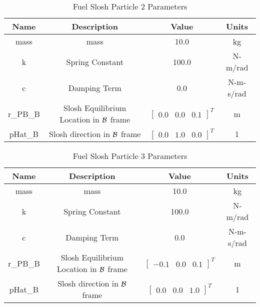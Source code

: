 \begin{table}[htbp]
	\caption{Fuel Slosh Particle 2 Parameters}
	\label{tab:slosh2}
	\centering \fontsize{10}{10}\selectfont
	\begin{tabular}{| c | c | c | c |} %
		\hline
		\textbf{Name}  & \textbf{Description}  & \textbf{Value} & \textbf{Units} \\
		\hline
		mass  & mass & 10.0 & kg \\
		\hline
		k & Spring Constant & 100.0 & N-m/rad \\
		\hline
		c & Damping Term & 0.0 & N-m-s/rad \\
		\hline
		r\_PB\_B & Slosh Equilibrium Location in $\cal{B}$ frame & $\begin{bmatrix}
		0.0 & 0.0 & 0.1 \end{bmatrix}^T$ & m \\
		\hline
		pHat\_B & Slosh direction in $\cal{B}$ frame & $\begin{bmatrix}
		0.0 & 1.0 & 0.0 \end{bmatrix}^T$ & 1 \\
		\hline
	\end{tabular}
\end{table}

\begin{table}[htbp]
	\caption{Fuel Slosh Particle 3 Parameters}
	\label{tab:slosh3}
	\centering \fontsize{10}{10}\selectfont
	\begin{tabular}{| c | c | c | c |} %
		\hline
		\textbf{Name}  & \textbf{Description}  & \textbf{Value} & \textbf{Units} \\
		\hline
		mass  & mass & 10.0 & kg \\
		\hline
		k & Spring Constant & 100.0 & N-m/rad \\
		\hline
		c & Damping Term & 0.0 & N-m-s/rad \\
		\hline
		r\_PB\_B & Slosh Equilibrium Location in $\cal{B}$ frame & $\begin{bmatrix}
		-0.1 & 0.0 & 0.1 \end{bmatrix}^T$ & m \\
		\hline
		pHat\_B & Slosh direction in $\cal{B}$ frame & $\begin{bmatrix}
		0.0 & 0.0 & 1.0 \end{bmatrix}^T$ & 1 \\
		\hline
	\end{tabular}
\end{table}

